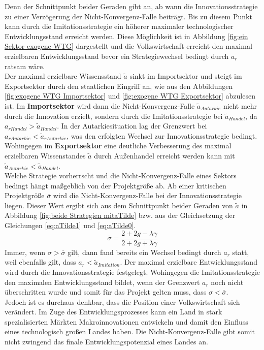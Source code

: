 %
Denn der Schnittpunkt beider Geraden gibt an, ab wann die \textcolor[rgb]{0.74,0.97,0.22}{Innovationsstrategie} zu einer Verzögerung der Nicht-Konvergenz-Falle beiträgt. Bis zu diesem Punkt kann durch die \textcolor[rgb]{0,0.32,0}{Imitationsstrategie} ein höherer maximaler technologischer Entwicklungsstand erreicht werden. Diese Möglichkeit ist in Abbildung \ref{fig:ein Sektor exogene WTG} dargestellt und die Volkswirtschaft erreicht den maximal erzielbaren Entwicklungsstand bevor ein Strategiewechsel bedingt durch $a_r$ ratsam wäre.\\
%
Der maximal erzielbare Wissensstand $\tilde{a}$ sinkt im Importsektor  und steigt im Exportsektor durch den staatlichen Eingriff an, wie aus den Abbildungen \ref{fig:exogene WTG Importsektor} und \ref{fig:exogene WTG Exportsektor} abzulesen ist. Im \textbf{Importsektor} wird dann die Nicht-Konvergenz-Falle $\tilde{a}_{Autarkie}$ nicht mehr durch die Innovation erzielt, sondern durch die \textcolor[rgb]{0,0.32,0}{Imitationsstrategie} bei $\tilde{a}_{Handel}$, da $a_{rHandel}>\tilde{a}_{Handel}$. In der Autarkiesituation lag der Grenzwert bei $a_{rAutarkie}<\tilde{a}_{rAutarkie}$, was den erfolgten Wechsel zur \textcolor[rgb]{0.74,0.97,0.22}{Innovationsstrategie} bedingt. Wohingegen im \textbf{Exportsektor} eine deutliche Verbesserung des maximal erzielbaren Wissenstandes $\tilde{a}$ durch Außenhandel erreicht werden kann mit $\tilde{a}_{Autarkie}<\tilde{a}_{Handel}$.\\
%
Welche Strategie vorherrscht und die Nicht-Konvergenz-Falle eines Sektors bedingt hängt maßgeblich von der Projektgröße ab. Ab einer kritischen Projektgröße $\overline{\sigma}$ wird die Nicht-Konvergenz-Falle bei der Innovationsstrategie liegen. Dieser Wert ergibt sich aus dem Schnittpunkt beider Geraden von $\tilde{a}$ in Abbildung \ref{fig:beide Strategien mitaTilde} bzw. aus der Gleichsetzung der Gleichungen \ref{eq:aTilde1} und \ref{eq:aTilde0}.
%
	\begin{equation} 
		\overline{\sigma}=\frac{2+2g-\lambda\gamma}{2+2g+\lambda\gamma}
	\end{equation} 
%
Immer, wenn $\sigma>\overline{\sigma}$ gilt, dann fand bereits ein Wechsel bedingt durch $a_r$ statt, weil ebenfalls gilt, dass $a_r<\tilde{a}_{Imitation}$. Der maximal erzielbare Entwicklungsstand wird durch die Innovationsstrategie festgelegt. Wohingegen die Imitationsstrategie den maximalen Entwicklungsstand bildet, wenn der Grenzwert $a_r$ noch nicht überschritten wurde und somit für das Projekt gelten muss, dass $\sigma<\overline{\sigma}$.\\
Jedoch ist es durchaus denkbar, dass die Position einer Volkswirtschaft sich verändert. Im Zuge des Entwicklungsprozesses kann ein Land in stark spezialisierten Märkten Makroinnovationen entwickeln und damit den Einfluss eines technologisch großen Landes haben. Die Nicht-Konvergenz-Falle gibt somit nicht zwingend das finale Entwicklungspotenzial eines Landes an. 
%
